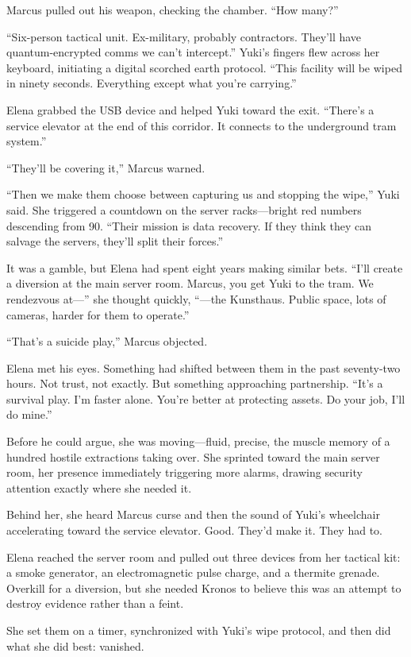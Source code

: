Marcus pulled out his weapon, checking the chamber. ``How many?''

``Six-person tactical unit. Ex-military, probably contractors. They'll
have quantum-encrypted comms we can't intercept.'' Yuki's fingers flew
across her keyboard, initiating a digital scorched earth protocol.
``This facility will be wiped in ninety seconds. Everything except what
you're carrying.''

Elena grabbed the USB device and helped Yuki toward the exit. ``There's
a service elevator at the end of this corridor. It connects to the
underground tram system.''

``They'll be covering it,'' Marcus warned.

``Then we make them choose between capturing us and stopping the wipe,''
Yuki said. She triggered a countdown on the server racks---bright red
numbers descending from 90. ``Their mission is data recovery. If they
think they can salvage the servers, they'll split their forces.''

It was a gamble, but Elena had spent eight years making similar bets.
``I'll create a diversion at the main server room. Marcus, you get Yuki
to the tram. We rendezvous at---'' she thought quickly, ``---the
Kunsthaus. Public space, lots of cameras, harder for them to operate.''

``That's a suicide play,'' Marcus objected.

Elena met his eyes. Something had shifted between them in the past
seventy-two hours. Not trust, not exactly. But something approaching
partnership. ``It's a survival play. I'm faster alone. You're better at
protecting assets. Do your job, I'll do mine.''

Before he could argue, she was moving---fluid, precise, the muscle
memory of a hundred hostile extractions taking over. She sprinted toward
the main server room, her presence immediately triggering more alarms,
drawing security attention exactly where she needed it.

Behind her, she heard Marcus curse and then the sound of Yuki's
wheelchair accelerating toward the service elevator. Good. They'd make
it. They had to.

Elena reached the server room and pulled out three devices from her
tactical kit: a smoke generator, an electromagnetic pulse charge, and a
thermite grenade. Overkill for a diversion, but she needed Kronos to
believe this was an attempt to destroy evidence rather than a feint.

She set them on a timer, synchronized with Yuki's wipe protocol, and
then did what she did best: vanished.

